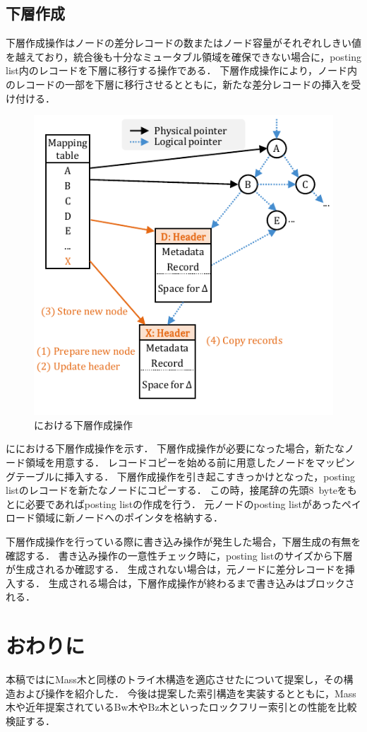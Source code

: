 \subsection{下層作成}
下層作成操作はノードの差分レコードの数またはノード容量がそれぞれしきい値を越えており，統合後も十分なミュータブル領域を確保できない場合に，posting list内のレコードを下層に移行する操作である．
下層作成操作により，ノード内のレコードの一部を下層に移行させるとともに，新たな差分レコードの挿入を受け付ける．

\begin{figure}[t]
    \centering
    \includegraphics{./figures/layer.pdf}
    \caption{\Bcforest{}における下層作成操作}
    \label{fig:bc_tree_layer}
\end{figure}

\Fig{\ref{fig:bc_tree_layer}}に\Bcforest{}における下層作成操作を示す．
下層作成操作が必要になった場合，新たなノード領域を用意する．
レコードコピーを始める前に用意したノードをマッピングテーブルに挿入する．
下層作成操作を引き起こすきっかけとなった，posting listのレコードを新たなノードにコピーする．
この時，接尾辞の先頭8~byteをもとに必要であればposting listの作成を行う．
元ノードのposting listがあったペイロード領域に新ノードへのポインタを格納する．

下層作成操作を行っている際に書き込み操作が発生した場合，下層生成の有無を確認する．
書き込み操作の一意性チェック時に，posting listのサイズから下層が生成されるか確認する．
生成されない場合は，元ノードに差分レコードを挿入する．
生成される場合は，下層作成操作が終わるまで書き込みはブロックされる．

\section{おわりに}
\label{sec:conclusion}
本稿では\Bctree{}にMass木と同様のトライ木構造を適応させた\Bcforest{}について提案し，その構造および操作を紹介した．
今後は提案した索引構造を実装するとともに，Mass木や近年提案されているBw木やBz木といったロックフリー索引との性能を比較検証する．